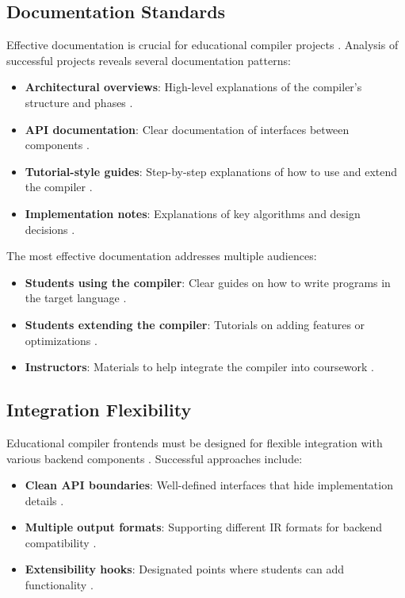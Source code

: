 \subsection{Documentation Standards}

Effective documentation is crucial for educational compiler projects \cite{forward2002relevance}. Analysis of successful projects reveals several documentation patterns:

\begin{itemize}
    \item \textbf{Architectural overviews}: High-level explanations of the compiler's structure and phases \cite{forward2002relevance}.
    \item \textbf{API documentation}: Clear documentation of interfaces between components \cite{forward2002relevance}.
    \item \textbf{Tutorial-style guides}: Step-by-step explanations of how to use and extend the compiler \cite{patel2021comparing}.
    \item \textbf{Implementation notes}: Explanations of key algorithms and design decisions \cite{appel1998modern}.
\end{itemize}

The most effective documentation addresses multiple audiences:
\begin{itemize}
    \item \textbf{Students using the compiler}: Clear guides on how to write programs in the target language \cite{forward2002relevance}.
    \item \textbf{Students extending the compiler}: Tutorials on adding features or optimizations \cite{patel2021comparing}.
    \item \textbf{Instructors}: Materials to help integrate the compiler into coursework \cite{forward2002relevance}.
\end{itemize}

\subsection{Integration Flexibility}

Educational compiler frontends must be designed for flexible integration with various backend components \cite{jones1997minimal}. Successful approaches include:

\begin{itemize}
    \item \textbf{Clean API boundaries}: Well-defined interfaces that hide implementation details \cite{jones1997minimal}.
    \item \textbf{Multiple output formats}: Supporting different IR formats for backend compatibility \cite{lattner2004llvm}.
    \item \textbf{Extensibility hooks}: Designated points where students can add functionality \cite{patel2021comparing}.
\end{itemize}

